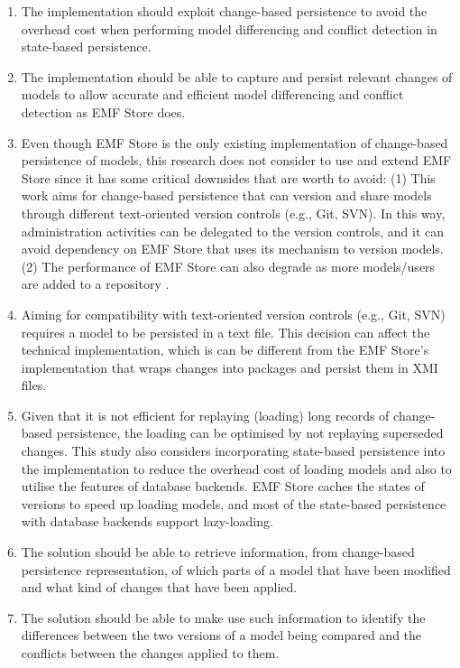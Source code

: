 \begin{enumerate}
  \item The implementation should exploit change-based persistence to avoid the overhead cost when performing model differencing and conflict detection in state-based persistence.
  \item The implementation should be able to capture and persist relevant changes of models to allow accurate and efficient model differencing and conflict detection as EMF Store does.
  \item Even though EMF Store is the only existing implementation of change-based persistence of models, this research does not consider to use and extend EMF Store since it has some critical downsides that are worth to avoid: (1) This work aims for change-based persistence that can version and share models through different text-oriented version controls (e.g., Git, SVN). In this way, administration activities can be delegated to the version controls, and it can avoid dependency on EMF Store that uses its mechanism to version models. (2) The performance of EMF Store can also degrade as more models/users are added to a repository \cite{KolovosRMPGCLRV13}.
  \item Aiming for compatibility with text-oriented version controls (e.g., Git, SVN) requires a model to be persisted in a text file. This decision can affect the technical implementation, which is can be different from the EMF Store's implementation that wraps changes into packages and persist them in XMI files.
  \item Given that it is not efficient for replaying (loading) long records of change-based persistence, the loading can be optimised by not replaying superseded changes. This study also considers incorporating state-based persistence into the implementation to reduce the overhead cost of loading models and also to utilise the features of database backends. EMF Store caches the states of versions to speed up loading models, and most of the state-based persistence with database backends support lazy-loading.
  \item The solution should be able to retrieve information, from change-based persistence representation, of which parts of a model that have been modified and what kind of changes that have been applied.
  \item The solution should be able to make use such information to identify the differences between the two versions of a model being compared and the conflicts between the changes applied to them.
\end{enumerate}


